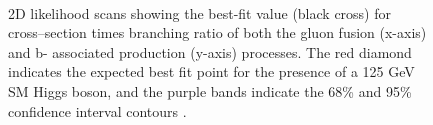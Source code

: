 \begin{figure}[h!]
\begin{center}
~\\
\end{center}
\caption{2D likelihood scans showing the best-fit value (black cross) for cross--section times branching ratio 
of both the gluon fusion (x-axis) and b- associated production (y-axis) processes. The red diamond indicates the
expected best fit point for the presence of a 125 GeV SM Higgs boson, and the purple bands indicate the 68\% and
95\% confidence interval contours \cite{CMS-PAS-HIG-16-037}.}
\label{fig:mssm_results_2D_scans}
\end{figure}

